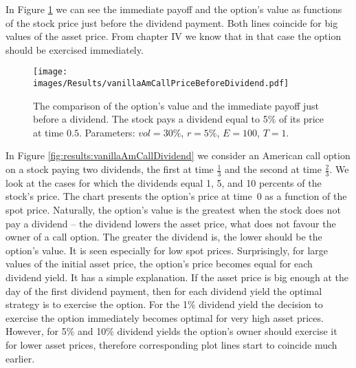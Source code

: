 \documentclass[a4paper,11pt, twoside]{book}
\theoremstyle{definition}
\theoremstyle{remark}
\begin{document}
In Figure \ref{fig:results:vanillaAmCallPriceBeforeDividend} we can see the immediate payoff and the option's value as functions of the stock price just before the dividend payment. Both lines coincide for big values of the asset price. From chapter IV we know that in that case the option should be exercised immediately. 


\begin{figure}[!htb]
\centering
 \texttt{[image: images/Results/vanillaAmCallPriceBeforeDividend.pdf]}
\caption{The comparison of the option's value and the immediate payoff just before a dividend. The stock pays a dividend equal to 5\% of its price at time $0.5$. Parameters: $vol = 30\%$, $r=5\%$, $E=100$, $T=1$. }
\label{fig:results:vanillaAmCallPriceBeforeDividend}
\end{figure}


In Figure \ref{fig:results:vanillaAmCallDividend} we consider an American call option on a stock paying two dividends, the first at time $\frac{1}{3}$ and the second at time $\frac{2}{3}$. We look at the cases for which the dividends equal 1, 5, and 10 percents of the stock's price. The chart presents the option's price at time~0 as a function of the spot price. Naturally, the option's value is the greatest when the stock does not pay a dividend -- the dividend lowers the asset price, what does not favour the owner of a call option. The greater the dividend is, the lower should be the option's value. It is seen especially for low spot prices. Surprisingly, for large values of the initial asset price, the option's price becomes equal for each dividend yield. It has a simple explanation. If the asset price is big enough at the day of the first dividend payment, then for each dividend yield the optimal strategy is to exercise the option. For the 1\% dividend yield the decision to exercise the option immediately becomes optimal for very high asset prices. However, for 5\% and 10\% dividend yields the option's owner should exercise it for lower asset prices, therefore corresponding plot lines start to coincide much earlier.
\end{document}
